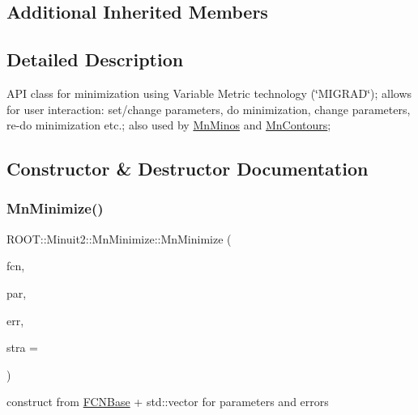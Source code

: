 \subsection*{Additional Inherited Members}


\subsection{Detailed Description}
A\+PI class for minimization using Variable Metric technology (\char`\"{}\+M\+I\+G\+R\+A\+D\char`\"{}); allows for user interaction\+: set/change parameters, do minimization, change parameters, re-\/do minimization etc.; also used by \mbox{\hyperlink{classROOT_1_1Minuit2_1_1MnMinos}{Mn\+Minos}} and \mbox{\hyperlink{classROOT_1_1Minuit2_1_1MnContours}{Mn\+Contours}}; 

\subsection{Constructor \& Destructor Documentation}
\mbox{\label{classROOT_1_1Minuit2_1_1MnMinimize_ab556cdc37be07557d060aa179a7e0d1f}} 
\subsubsection{\texorpdfstring{MnMinimize()}{MnMinimize()}\hspace{0.1cm}{\footnotesize\ttfamily [1/26]}}
{\footnotesize\ttfamily R\+O\+O\+T\+::\+Minuit2\+::\+Mn\+Minimize\+::\+Mn\+Minimize (\begin{DoxyParamCaption}\item[{const \mbox{\hyperlink{classROOT_1_1Minuit2_1_1FCNBase}{F\+C\+N\+Base}} \&}]{fcn,  }\item[{const std\+::vector$<$ double $>$ \&}]{par,  }\item[{const std\+::vector$<$ double $>$ \&}]{err,  }\item[{unsigned int}]{stra = {} }\end{DoxyParamCaption})\hspace{0.3cm}{\ttfamily [inline]}}



construct from \mbox{\hyperlink{classROOT_1_1Minuit2_1_1FCNBase}{F\+C\+N\+Base}} + std\+::vector for parameters and errors 


